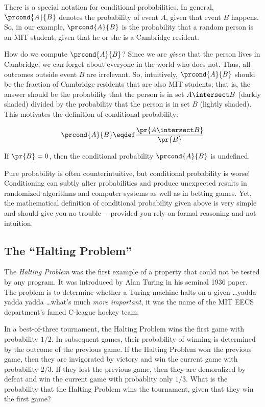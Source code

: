 There is a special notation for conditional probabilities.  In
general, $\prcond{A}{B}$ denotes the probability of event $A$, given
that event $B$ happens.  So, in our example, $\prcond{A}{B}$ is the
probability that a random person is an MIT student, given that he or
she is a Cambridge resident.

How do we compute $\prcond{A}{B}$?  Since we are \textit{given} that
the person lives in Cambridge, we can forget about everyone in the
world who does not.  Thus, all outcomes outside event $B$ are
irrelevant.  So, intuitively, $\prcond{A}{B}$ should be the fraction
of Cambridge residents that are also MIT students; that is, the answer
should be the probability that the person is in set $A \intersect B$ (darkly
shaded) divided by the probability that the person is in set $B$
(lightly shaded).  This motivates the definition of conditional
probability:
\begin{definition}\label{LN12:prcond}
\[
\prcond{A}{B} \eqdef \frac{\pr{A \intersect B}}{\pr{B}}
\]
\end{definition}
If $\pr{B} = 0$, then the conditional probability $\prcond{A}{B}$ is
undefined.

Pure probability is often counterintuitive, but conditional probability is
worse!  Conditioning can subtly alter probabilities and produce unexpected
results in randomized algorithms and computer systems as well as in
betting games.  Yet, the mathematical definition of conditional
probability given above is very simple and should give you no trouble---
provided you rely on formal reasoning and not intuition.

\subsection{The ``Halting Problem''}

The \emph{Halting Problem} was the first example of a property that could
not be tested by any program.  It was introduced by Alan Turing in his
seminal 1936 paper.  The problem is to determine whether a Turing machine
halts on a given \dots yadda yadda yadda \dots what's much \emph{more
  important}, it was the name of the MIT EECS department's famed C-league
hockey team.

In a best-of-three tournament, the Halting Problem wins the first game
with probability $1/2$.  In subsequent games, their
probability of winning is determined by the outcome of the previous
game.  If the Halting Problem won the previous game, then they are
invigorated by victory and win the current game with probability
$2/3$.  If they lost the previous game, then they are
demoralized by defeat and win the current game with probablity only
$1/3$.  What is the probability that the Halting Problem wins
the tournament, given that they win the first game?


